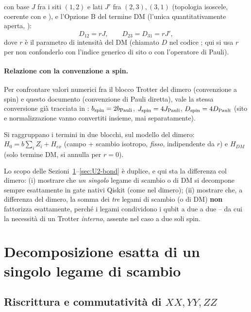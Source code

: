 \documentclass[11pt,a4paper]{article}
\begin{document}
con base $J$ fra i siti $(1,2)$ e lati $J'$ fra $(2,3),(3,1)$ (topologia isoscele, coerente con \texttt{} e \texttt{}), e l'Opzione B del termine DM (l'unica quantitativamente aperta, \texttt{}):
\begin{equation}
D_{12}=rJ, \qquad D_{23}=D_{31}=rJ',
\label{eq:optionB}
\end{equation}
dove $r$ è il parametro di intensità del DM (chiamato $D$ nel codice \texttt{}; qui si usa $r$ per non confonderlo con l'indice generico di sito o con l'operatore di Pauli).

\paragraph{Relazione con la convenzione a spin.} Per confrontare valori numerici fra il blocco Trotter del dimero (convenzione a spin) e questo documento (convenzione di Pauli diretta), vale la stessa conversione già tracciata in \texttt{}: $b_{\rm spin}=2b_{\rm Pauli}$, $J_{\rm spin}=4J_{\rm Pauli}$, $D_{\rm spin}=4D_{\rm Pauli}$ (sito e normalizzazione vanno convertiti insieme, mai separatamente).

Si raggruppano i termini in due blocchi, sul modello del dimero: $H_0=b\sum_i Z_i+H_{ex}$ (campo + scambio isotropo, \emph{fisso}, indipendente da $r$) e $H_{DM}$ (solo termine DM, si annulla per $r=0$).

Lo scopo delle Sezioni~\ref{sec:bond-exact}--\ref{sec:U2-bond} è duplice, e qui sta la differenza col dimero: (i) mostrare che \emph{un singolo} legame di scambio o di DM si decompone sempre esattamente in gate nativi Qiskit (come nel dimero); (ii) mostrare che, a differenza del dimero, la somma dei \emph{tre} legami di scambio (o di DM) \textbf{non} fattorizza esattamente, perché i legami condividono i qubit a due a due -- da cui la necessità di un Trotter \emph{interno}, assente nel caso a due soli spin.

\section{Decomposizione esatta di un singolo legame di scambio}
\label{sec:bond-exact}

\subsection{Riscrittura e commutatività di $XX,YY,ZZ$}
\end{document}
